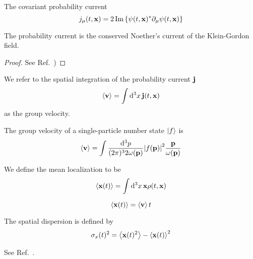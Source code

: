 \begin{definition}
	The covariant probability current
	\begin{equation}
		j_\mu(t,\vb{x})
		=
		2
		\operatorname{\operatorname{Im}}\left\{
			\psi(t,\vb{x})^*
			\partial_\mu
			\psi(t,\vb{x})
		\right\}
		\label{eq:qkg_probability_current}
	\end{equation}	
\end{definition}
\begin{lemma}
	The probability current is the conserved Noether's current of the Klein-Gordon field.
\end{lemma}
\begin{proof}
	See Ref.~\cite[p.~18]{Peskin1995})
\end{proof}

\begin{definition}
	We refer to the spatial integration of the probability current $\vb{j}$
	\begin{equation}
		\expval{\vb{v}}
		=
		\int\dd[3]{x}
		\vb{j}(t,\vb{x})
		\label{eq:group_velocity}
	\end{equation}
	as the group velocity.
\end{definition}
\begin{example}
	The group velocity of a single-particle number state $\ket{f}$ is
	\begin{equation}
		\expval{\vb{v}}
		=
		\int\frac{\dd[3]{p}}{(2\pi)^32\omega(\vb{p})}
		\abs{f(\vb{p})}^2
		\frac{\vb{p}}{\omega(\vb{p})}
		\label{eq:single_particle_number_state_group_velocity}
	\end{equation}
\end{example}
\begin{definition}
	We define the mean localization to be
	\begin{equation}
		\expval{\vb{x}(t)}
		=
		\int\dd[3]{x}
		\vb{x}
		\rho(t,\vb{x})
	\end{equation}
\end{definition}
\begin{example}
	\begin{equation}
		\expval{\vb{x}(t)}
		=
		\expval{\vb{v}}t
	\end{equation}	
\end{example}
\begin{definition}
	The spatial dispersion is defined by
	\begin{equation}
		\sigma_x(t)^2
		=
		\expval{\vb{x}(t)^2}
		-
		\expval{\vb{x}(t)}^2		
	\end{equation}
\end{definition}
\begin{example}
	See Ref.~\cite{Naumov2013}.
\end{example}

